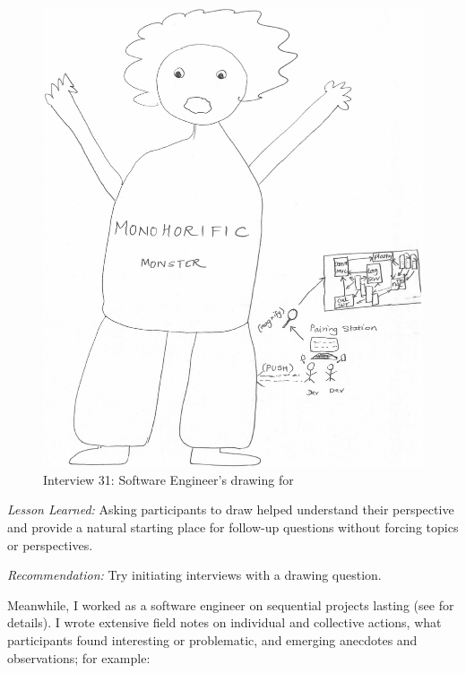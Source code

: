 \begin{figure}[tbp]
\centering
\includegraphics[width=\oneColumnWidth{}]{drawings/2016_09_26_fitted.png}
\caption{Interview 31: Software Engineer's drawing for }
\label{Interview31}
\end{figure}

\textit{Lesson Learned:} Asking participants to draw helped understand their perspective and provide a natural starting place for follow-up questions without forcing topics or perspectives.

\textit{Recommendation:} Try initiating interviews with a drawing question.

Meanwhile, I worked as a software engineer on \numberOfObservedProjects{} sequential projects lasting \durationOfResearchStudyPlural{} (see \cite{SedanoSoftwareDevelopmentWaste} for details). I wrote extensive field notes on individual and collective actions, what participants found interesting or problematic, and emerging anecdotes and observations; for example: 


